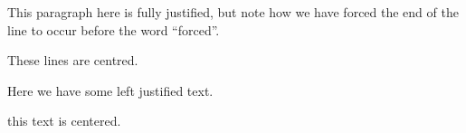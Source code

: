 \documentclass{article}
\begin{document}
This paragraph here is fully justified, but note how we have \linebreak forced the end of the line to occur before the word ``forced''.

\begin{center}
    These lines \linebreak are centred.
\end{center}

\raggedright {Here we have some \linebreak left justified \linebreak text.}


\centerline{this text is centered.}
\end{document}

